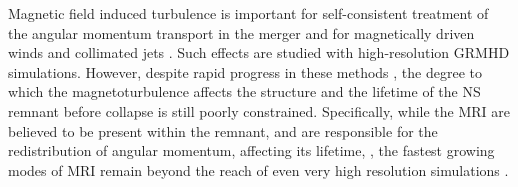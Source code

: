 
%
Magnetic field induced turbulence is important for 
self-consistent treatment of the angular momentum transport in the merger
\citep{Duez:2006qe,Kiuchi:2014hja,Guilet:2016sqd,Kiuchi:2017zzg}
and for magnetically driven winds and collimated jets 
\citep{Rezzolla:2011da,Bucciantini:2011kx,Siegel:2014ita,Ruiz:2016rai,Metzger:2018uni}.
%
Such effects are studied with high-resolution \ac{GRMHD} simulations. 
However, despite rapid progress in these methods 
\citep[\eg][]{Rezzolla:2011da,Kiuchi:2014hja,Ruiz:2016rai},
the degree to which the magnetoturbulence affects the structure and the 
lifetime of the \pmerg{} \ac{NS} remnant before collapse is still poorly constrained.
%
Specifically, while the \ac{MRI} are believed to be present within the 
remnant, and are responsible for the redistribution of angular 
momentum, affecting 
its lifetime, \citep[\eg][]{Duez:2006qe,Siegel:2013nrw}, 
the fastest growing modes of \ac{MRI} remain beyond the 
reach of even very high resolution simulations \citep[\eg][]{Kiuchi:2014hja}.
%
%
%


